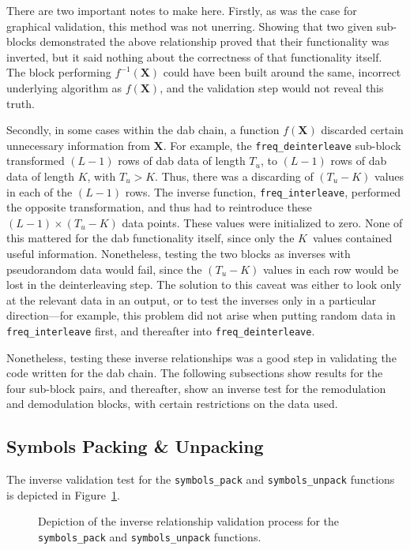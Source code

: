 \documentclass[class=report,11pt,crop=false]{standalone}
\begin{document}
There are two important notes to make here. Firstly, as was the case for graphical validation, this method was not unerring. Showing that two given sub-blocks demonstrated the above relationship proved that their functionality was inverted, but it said nothing about the correctness of that functionality itself. The block performing \(f^{-1}(\mathbf{X})\) could have been built around the same, incorrect underlying algorithm as \(f(\mathbf{X})\), and the validation step would not reveal this truth.

Secondly, in some cases within the \gls{dab} chain, a function \(f(\mathbf{X})\) discarded certain unnecessary information from \(\mathbf{X}\). For example, the \texttt{freq\_deinterleave} sub-block transformed \((L-1)\) rows of \gls{dab} data of length \(T_u\), to \((L-1)\) rows of \gls{dab} data of length \(K\), with \(T_u > K\). Thus, there was a discarding of \((T_u - K)\) values in each of the  \((L-1)\) rows. The inverse function, \texttt{freq\_interleave}, performed the opposite transformation, and thus had to reintroduce these \((L-1)\times(T_u - K)\) data points. These values were initialized to zero. None of this mattered for the \gls{dab} functionality itself, since only the \(K\)~values contained useful information. Nonetheless, testing the two blocks as inverses with pseudorandom data would fail, since the \((T_u - K)\) values in each row would be lost in the deinterleaving step. The solution to this caveat was either to look only at the relevant data in an output, or to test the inverses only in a particular direction---for example, this problem did not arise when putting random data in \texttt{freq\_interleave} first, and thereafter into \texttt{freq\_deinterleave}.

Nonetheless, testing these inverse relationships was a good step in validating the code written for the \gls{dab} chain. The following subsections show results for the four sub-block pairs, and thereafter, show an inverse test for the remodulation and demodulation blocks, with certain restrictions on the data used.

\subsection{Symbols Packing \& Unpacking}
The inverse validation test for the \texttt{symbols\_pack} and \texttt{symbols\_unpack} functions is depicted in Figure~\ref{fig:inverse-symbols-pack-unpack}.

\begin{figure}[htbp]
  \centering
  \captionsetup{type=figure}
  \def\svgwidth{0.95\linewidth}
  { %
      }
  \caption{Depiction of the inverse relationship validation process for the \texttt{symbols\_pack} and \texttt{symbols\_unpack} functions.}
  \label{fig:inverse-symbols-pack-unpack}
\end{figure}
\end{document}
